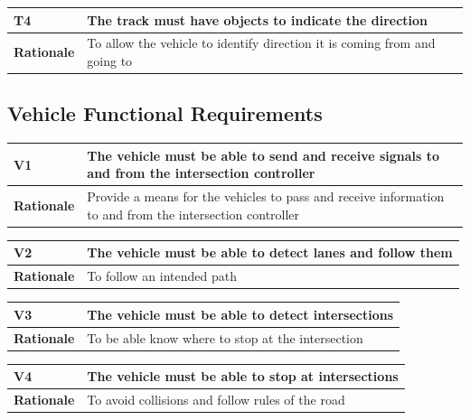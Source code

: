 \documentclass [11pt]{article}
\begin{document}
\begin{longtable}{| p{ } | p{ } | }\hline 
\rowcolor{tableCell}\textbf{T4} & The track must have objects to indicate the direction \\ \hline
\textbf{Rationale} &  To allow the vehicle to identify direction it is coming from and going to\\ \hline 


\end{longtable}



\subsection{Vehicle Functional Requirements}


\begin{longtable}{| p{ } | p{ } | }\hline 
\rowcolor{tableCell}\textbf{V1} & The vehicle must be able to send and receive signals to and from the intersection controller \\ \hline
\textbf{Rationale} &  Provide a means for the vehicles to pass and receive information to and from the intersection controller\\ \hline 
\end{longtable}

\begin{longtable}{| p{ } | p{ } | }\hline 
\rowcolor{tableCell}\textbf{V2} & The vehicle must be able to detect lanes and follow them \\ \hline
\textbf{Rationale} &  To follow an intended path\\ \hline 

\end{longtable}

\begin{longtable}{| p{ } | p{ } | }\hline 
\rowcolor{tableCell}\textbf{V3} & The vehicle must be able to detect intersections \\ \hline
\textbf{Rationale} &  To be able know where to stop at the intersection\\ \hline 

\end{longtable}

\begin{longtable}{| p{ } | p{ } | }\hline 
\rowcolor{tableCell}\textbf{V4} & The vehicle must be able to stop at intersections \\ \hline
\textbf{Rationale} & To avoid collisions and follow rules of the road \\ \hline 

\end{longtable}
\end{document}
